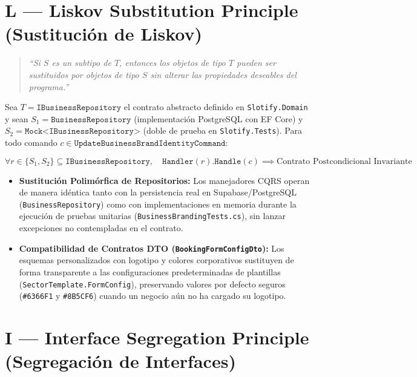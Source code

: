 \documentclass[11pt,a4paper]{article}
\begin{document}
\section{L --- Liskov Substitution Principle (Sustitución de Liskov)}

\begin{quote}
\textit{``Si $S$ es un subtipo de $T$, entonces los objetos de tipo $T$ pueden ser sustituidos por objetos de tipo $S$ sin alterar las propiedades deseables del programa.''}
\end{quote}

Sea $T = \texttt{IBusinessRepository}$ el contrato abstracto definido en \texttt{Slotify.Domain} y sean $S_1 = \texttt{BusinessRepository}$ (implementación PostgreSQL con EF Core) y $S_2 = \texttt{Mock<IBusinessRepository>}$ (doble de prueba en \texttt{Slotify.Tests}). Para todo comando $c \in \texttt{UpdateBusinessBrandIdentityCommand}$:

\[
\forall r \in \{S_1, S_2\} \subseteq \texttt{IBusinessRepository}, \quad \texttt{Handler}(r).\texttt{Handle}(c) \implies \text{Contrato Postcondicional Invariante}
\]

\begin{itemize}
    \item \textbf{Sustitución Polimórfica de Repositorios:} Los manejadores CQRS operan de manera idéntica tanto con la persistencia real en Supabase/PostgreSQL (\texttt{BusinessRepository}) como con implementaciones en memoria durante la ejecución de pruebas unitarias (\texttt{BusinessBrandingTests.cs}), sin lanzar excepciones no contempladas en el contrato.
    \item \textbf{Compatibilidad de Contratos DTO (\texttt{BookingFormConfigDto}):} Los esquemas personalizados con logotipo y colores corporativos sustituyen de forma transparente a las configuraciones predeterminadas de plantillas (\texttt{SectorTemplate.FormConfig}), preservando valores por defecto seguros (\texttt{\#6366F1} y \texttt{\#8B5CF6}) cuando un negocio aún no ha cargado su logotipo.
\end{itemize}

\section{I --- Interface Segregation Principle (Segregación de Interfaces)}
\end{document}
